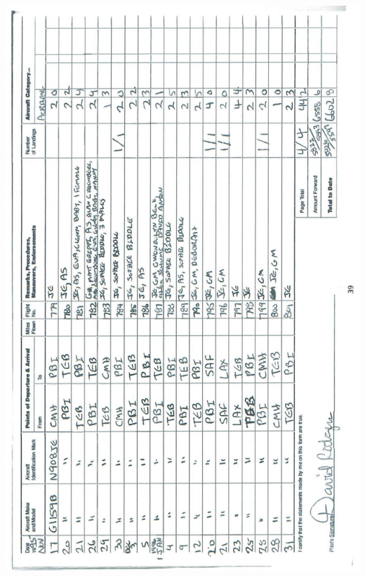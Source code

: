\documentclass[10pt]{article}
\begin{document}
\includegraphics[max width=\textwidth, center]{2025_02_27_dd68c3d38de88f0516d9g-043}\\
\end{document}
